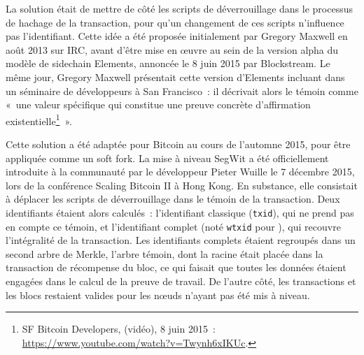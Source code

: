 La solution était de mettre de côté les scripts de déverrouillage dans le processus de hachage de la transaction, pour qu'un changement de ces scripts n'influence pas l'identifiant. Cette idée a été proposée initialement par Gregory Maxwell en août 2013 sur IRC, avant d'être mise en œuvre au sein de la version alpha du modèle de sidechain Elements, annoncée le 8 juin 2015 par Blockstream. Le même jour, Gregory Maxwell présentait cette version d'Elements incluant  dans un séminaire de développeurs à San Francisco~: il décrivait alors le témoin comme «~une valeur spécifique qui constitue une preuve concrète d'affirmation existentielle\footnote{SF Bitcoin Developers,  (vidéo), 8 juin 2015~: \url{https://www.youtube.com/watch?v=Twynh6xIKUc}.}~». %


Cette solution a été adaptée pour Bitcoin au cours de l'automne 2015, pour être appliquée comme un soft fork. La mise à niveau SegWit a été officiellement introduite à la communauté par le développeur Pieter Wuille le 7 décembre 2015, lors de la conférence Scaling Bitcoin \textsc{II} à Hong Kong. En substance, elle consistait à déplacer les scripts de déverrouillage dans le témoin de la transaction. Deux identifiants étaient alors calculés~: l'identifiant classique (\texttt{txid}), qui ne prend pas en compte ce témoin, et l'identifiant complet (noté \texttt{wtxid} pour ), qui recouvre l'intégralité de la transaction. Les identifiants complets étaient regroupés dans un second arbre de Merkle, l'arbre témoin, dont la racine était placée dans la transaction de récompense du bloc, ce qui faisait que toutes les données étaient engagées dans le calcul de la preuve de travail. De l'autre côté, les transactions et les blocs restaient valides pour les nœuds n'ayant pas été mis à niveau.

